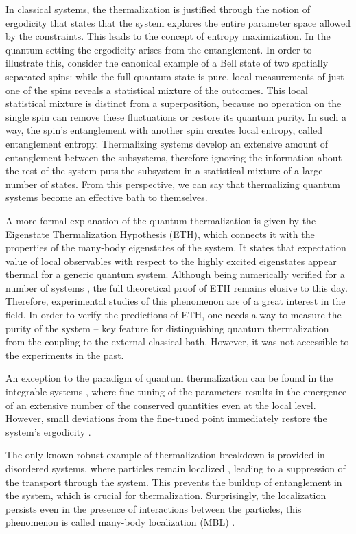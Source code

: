 In classical systems, the thermalization is justified through the notion of ergodicity that states that the system explores the entire parameter space allowed by the constraints. This leads to the concept of entropy maximization. In the quantum setting the ergodicity arises from the entanglement. In order to illustrate this, consider the canonical example of a Bell state of two spatially separated spins: while the full quantum state is pure, local measurements of just one of the spins reveals a statistical mixture of the outcomes. This local statistical mixture is distinct from a superposition, because no operation on the single spin can remove these fluctuations or restore its quantum purity. In such a way, the spin's entanglement with another spin creates local entropy, called entanglement entropy. Thermalizing systems develop an extensive amount of entanglement between the subsystems, therefore ignoring the information about the rest of the system puts the subsystem in a statistical mixture of a large number of states. From this perspective, we can say that thermalizing quantum systems become an effective bath to themselves.

A more formal explanation of the quantum thermalization is given by the Eigenstate Thermalization Hypothesis (ETH), which connects it with the properties of the many-body eigenstates of the system. It states that expectation value of local observables with respect to the highly excited eigenstates appear thermal for a generic quantum system. Although being numerically verified for a number of systems \cite{ Rigol2008, Santos2012, Dalessio2016, Alba2015}, the full theoretical proof of ETH remains elusive to this day. Therefore, experimental studies of this phenomenon are of a great interest in the field. In order to verify the predictions of ETH, one needs a way to measure the purity of the system -- key feature for distinguishing quantum thermalization from the coupling to the external classical bath. However, it was not accessible to the experiments in the past. 

An exception to the paradigm of quantum thermalization can be found in the integrable systems \cite{Mazets2008}, where fine-tuning of the parameters results in the emergence of an extensive number of the conserved quantities even at the local level. However, small deviations from the fine-tuned point immediately restore the system’s ergodicity \cite{Tang2018}.

The only known robust example of thermalization breakdown is provided in disordered systems, where particles remain localized \cite{ Anderson1958}, leading to a suppression of the transport through the system. This prevents the buildup of entanglement in the system, which is crucial for thermalization. Surprisingly, the localization persists even in the presence of interactions between the particles, this phenomenon is called many-body localization (MBL) \cite{ Anderson1958, Gornyi2005, Basko2006, Oganesyan2007}.


